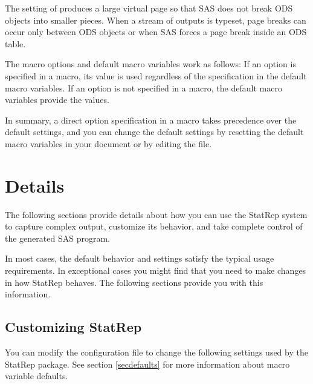 \documentclass[article,oneside]{memoir}
\newcommand*{\StatRep}{\textsf{StatRep}\xspace}
\begin{document}
  The setting of  produces a large
  virtual page so that SAS does not break ODS objects into smaller pieces.
  When a stream of outputs is typeset, page breaks can occur only between ODS objects or
  when SAS forces a page break inside an ODS table.

  The macro options and default macro variables work as follows:
  If an option is specified in a macro, its value is used regardless of
  the specification in the default macro variables.
  If an option is not specified in a macro, the default macro variables provide
  the values.

  In summary, a direct option specification in a macro takes precedence over the default
  settings, and you can change the default settings by resetting the
  default macro variables
  in your document or by editing the  file.


\chapter{Details}

The following sections provide details about how you can use the \StatRep system
to capture complex output, customize its behavior, and take complete control
of the generated SAS program.

In most cases, the default behavior and settings satisfy the typical usage requirements.
In exceptional cases you might find that you need to make changes in how \StatRep behaves.
The following sections provide you with this information.


 \section{Customizing \StatRep}\label{custom}

  You can modify the configuration file  to change
the following settings used by the \StatRep package.
  See section \ref{secdefaults} for more information about macro variable defaults.
\end{document}
